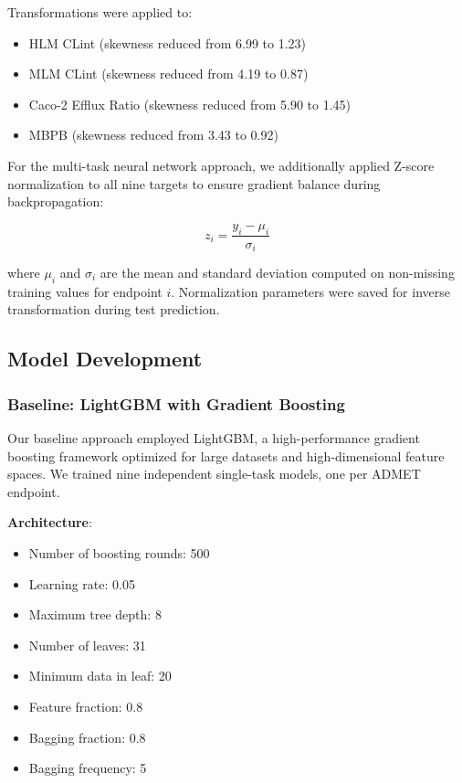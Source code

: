 \documentclass[11pt,a4paper]{article}
\begin{document}
Transformations were applied to:
\begin{itemize}
    \item HLM CLint (skewness reduced from 6.99 to 1.23)
    \item MLM CLint (skewness reduced from 4.19 to 0.87)
    \item Caco-2 Efflux Ratio (skewness reduced from 5.90 to 1.45)
    \item MBPB (skewness reduced from 3.43 to 0.92)
\end{itemize}

For the multi-task neural network approach, we additionally applied Z-score normalization to all nine targets to ensure gradient balance during backpropagation:

\begin{equation}
z_i = \frac{y_i - \mu_i}{\sigma_i}
\end{equation}

where $\mu_i$ and $\sigma_i$ are the mean and standard deviation computed on non-missing training values for endpoint $i$. Normalization parameters were saved for inverse transformation during test prediction.

\subsection{Model Development}

\subsubsection{Baseline: LightGBM with Gradient Boosting}

Our baseline approach employed LightGBM, a high-performance gradient boosting framework optimized for large datasets and high-dimensional feature spaces. We trained nine independent single-task models, one per ADMET endpoint.

\textbf{Architecture}:
\begin{itemize}
    \item Number of boosting rounds: 500
    \item Learning rate: 0.05
    \item Maximum tree depth: 8
    \item Number of leaves: 31
    \item Minimum data in leaf: 20
    \item Feature fraction: 0.8
    \item Bagging fraction: 0.8
    \item Bagging frequency: 5
\end{itemize}
\end{document}
